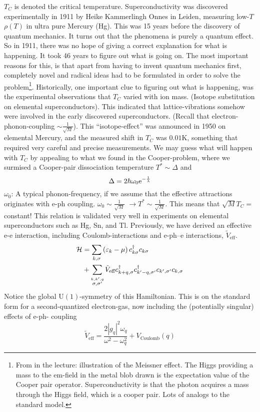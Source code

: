 $T_C$ is denoted the critical temperature. Superconductivity was discovered experimentally in 1911 by Heike Kammerlingh Onnes in Leiden, measuring low-$T$ $\rho(T)$ in ultra pure Mercury (Hg). This was 15 years before the discovery of quantum mechanics. It turns out that the phenomena is purely a quantum effect. So in 1911, there was no hope of giving a correct explanation for what is happening. It took 46 years to figure out what is going on. The most important reasons for this, is that apart from having to invent quantum mechanics first, completely novel and radical ideas had to be formulated in order to solve the problem\footnote{From in the lecture: illustration of the Meissner effect. The Higgs providing a mass to the em-field in the metal blob drawn is the expectation value of the Cooper pair operator. Superconductivity is that the photon acquires a mass through the Higgs field, which is a cooper pair. Lots of analogs to the standard model.}. Historically, one important clue to figuring out what is happening, was the experimental observations that $T_C$ varied with ion mass. (Isotope substitution on elemental superconductors). This indicated that lattice-vibrations somehow were involved in the early discovered superconductors. (Recall that electron-phonon-coupling $\sim\frac{1}{\sqrt{M}}$). This ``isotope-effect'' was announced in 1950 on elemental Mercury, and the measured shift in $T_C$ was $0.01\mathrm{K}$, something that required very careful and precise measurements. We may guess what will happen with $T_C$ by appealing to what we found in the Cooper-problem, where we surmised a Cooper-pair dissociation temperature $T^* \sim  \Delta$ and 
\begin{equation}
\Delta = 2\hbar\omega_0\mathrm{e}^{-\frac1\lambda}
\end{equation}
$\omega_0$: A typical phonon-frequency, if we assume that the effective attractions originates with e-ph coupling. $\omega_0\sim \frac{1}{\sqrt{M}}$ $\rightarrow T^* \sim \frac{1}{\sqrt{M}}$.
This means that $\sqrt{M}T_C =$constant! This relation is validated very well in experiments on elemental superconductors such as Hg, Sn, and Tl. 
Previously, we have derived an effective e-e interaction, including Coulomb-interactions and e-ph--e interactions, $\tilde{V}_{\text{eff}}$.
\begin{align}
\begin{split}
\mathcal{H} &= \sum_{k, \sigma}\left(\varepsilon_{k}-\mu\right)c^{\dagger}_{ k\sigma}c_{k\sigma} \\ &+ \sum_{\stackrel{k,k',q}{\sigma, \sigma'}}\tilde{V}_{\text{eff}}c^{\dagger}_{k+q, \sigma}c^{\dagger}_{k'-q, \sigma'}c_{k', \sigma'}c_{k, \sigma}
\end{split}
\end{align}
Notice the global $\mathrm{U}(1)$-symmetry of this Hamiltonian.
This is on the standard form for a second-quantized electron-gas, now including the (potentially singular) effects of e-ph- coupling
\begin{equation}
\tilde{V}_{\text{eff}} = \frac{2|g_q|^2\omega_q}{\omega^2 - \omega_q^2} + V_\text{Coulomb}(q)
\end{equation}

